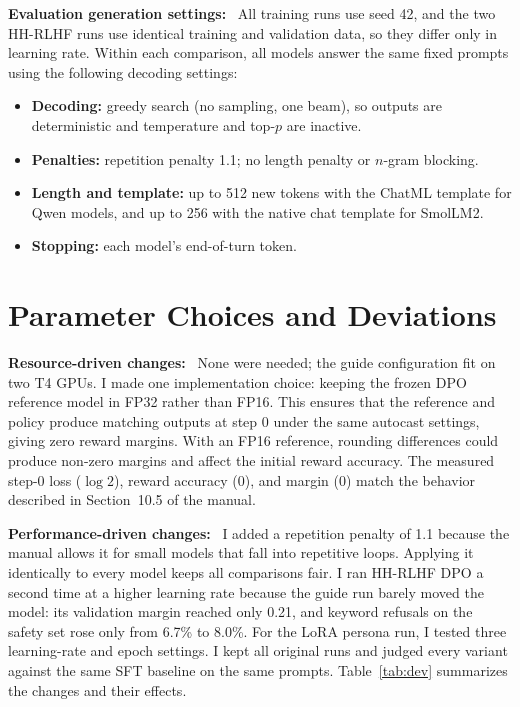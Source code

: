 \documentclass[10pt,a4paper]{article}
\newcommand{\para}[1]{\textbf{#1}\ }
\begin{document}
\para{Evaluation generation settings:} All training runs use seed 42, and the two HH-RLHF runs use identical training and validation data, so they differ only in learning rate. Within each comparison, all models answer the same fixed prompts using the following decoding settings:
\begin{itemize}
  \item \textbf{Decoding:} greedy search (no sampling, one beam), so outputs are deterministic and temperature and top-$p$ are inactive.
  \item \textbf{Penalties:} repetition penalty 1.1; no length penalty or $n$-gram blocking.
  \item \textbf{Length and template:} up to 512 new tokens with the ChatML template for Qwen models, and up to 256 with the native chat template for SmolLM2.
  \item \textbf{Stopping:} each model's end-of-turn token.
\end{itemize}

\section{Parameter Choices and Deviations}

\para{Resource-driven changes:} None were needed; the guide configuration
fit on two T4 GPUs. I made one implementation choice: keeping the frozen
DPO reference model in FP32 rather than FP16. This ensures that the
reference and policy produce matching outputs at step 0 under the same
autocast settings, giving zero reward margins. With an FP16 reference,
rounding differences could produce non-zero margins and affect the initial
reward accuracy. The measured step-0 loss ($\log 2$), reward accuracy (0),
and margin (0) match the behavior described in Section~10.5 of the manual.

\para{Performance-driven changes:} I added a repetition penalty of 1.1 because
the manual allows it for small models that fall into repetitive loops.
Applying it identically to every model keeps all comparisons fair. I ran
HH-RLHF DPO a second time at a higher learning rate because the guide run
barely moved the model: its validation margin reached only 0.21, and
keyword refusals on the safety set rose only from 6.7\% to 8.0\%. For the
LoRA persona run, I tested three learning-rate and epoch settings. I kept
all original runs and judged every variant against the same SFT baseline on
the same prompts. Table~\ref{tab:dev} summarizes the changes and their
effects.
\end{document}
